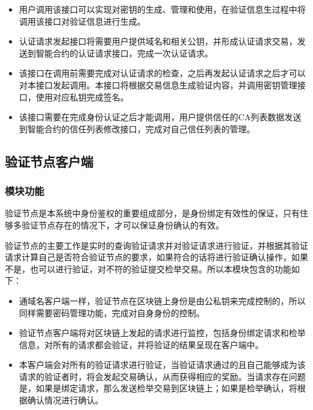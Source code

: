 \begin{itemize}
	\item 
	\noindent{}
	用户调用该接口可以实现对密钥的生成、管理和使用，在验证信息生过程中将调用该接口对验证信息进行生成。

	\item
	\noindent{}

	认证请求发起接口将需要用户提供域名和相关公钥，并形成认证请求交易，发送到智能合约的认证请求接口，完成一次认证请求。

	\item
	\noindent{}

	该接口在调用前需要完成对认证请求的检查，之后再发起认证请求之后才可以对本接口发起调用。本接口将根据交易信息生成验证内容，并调用密钥管理接口，使用对应私钥完成签名。

	\item
	\noindent{}

	该接口需要在完成身份认证之后才能调用，用户提供信任的CA列表数据发送到智能合约的信任列表修改接口，完成对自己信任列表的管理。
	

\end{itemize}




\subsection{验证节点客户端}

\subsubsection{模块功能}

验证节点是本系统中身份鉴权的重要组成部分，是身份绑定有效性的保证，只有住够多验证节点存在的情况下，才可以保证身份确认的有效。

验证节点的主要工作是实时的查询验证请求并对验证请求进行验证，并根据其验证请求计算自己是否符合验证节点的要求，如果符合的话将进行验证确认操作，如果不是，也可以进行验证，对不符的验证提交检举交易。所以本模块包含的功能如下：

\begin{itemize}
	\item 
	\noindent{}

	通域名客户端一样，验证节点在区块链上身份是由公私钥来完成控制的，所以同样需要密码管理功能，完成对自身身份的控制。

	\item 
	\noindent{}
	验证节点客户端将对区块链上发起的请求进行监控，包括身份绑定请求和检举信息，对所有的请求都会验证，并将验证的结果呈现在客户端中。

	\item
	\noindent{}

	本客户端会对所有的验证请求进行验证，当验证请求通过的且自己能够成为该请求的验证者时，将会发起交易确认，从而获得相应的奖励。当请求存在问题是，如果是绑定请求，那么发送检举交易到区块链上；如果是检举确认，将根据确认情况进行确认。
	

\end{itemize}

